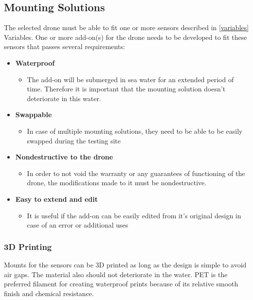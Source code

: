 \newpage
\subsection{Mounting Solutions}
The selected drone must be able to fit one or more sensors described in  \ref{variables} Variables. One or more add-on(s) for the drone needs to be developed to fit these sensors that passes several requirements:

\begin{itemize}
    \item \textbf{Waterproof}
          \begin{itemize} 
            \item The add-on will be submerged in sea water for an extended period of time. Therefore it is important that the mounting solution doesn't deteriorate in this water. 
          \end{itemize}
    \item \textbf{Swappable}
          \begin{itemize} 
            \item In case of multiple mounting solutions, they need to be able to be easily swapped during the testing site
          \end{itemize}
  \item \textbf{Nondestructive to the drone}
          \begin{itemize} 
            \item In order to not void the warranty or any guarantees of functioning of the drone, the modifications made to it must be nondestructive.
          \end{itemize}
  \item \textbf{Easy to extend and edit}
        \begin{itemize} 
            \item It is useful if the add-on can be easily edited from it's original design in case of an error or additional uses
        \end{itemize}
\end{itemize}

\subsubsection{3D Printing}
Mounts for the sensors can be 3D printed as long as the design is simple to avoid air gaps. The material also should not deteriorate in the water. PET is the preferred filament for creating waterproof prints because of its relative smooth finish and chemical resistance. \cite{pet}

